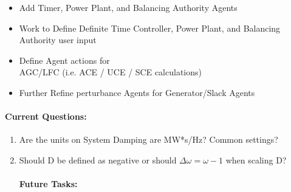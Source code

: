 \documentclass[12pt]{article}
\begin{document}
\begin{multicols}{2}
\begin{enumerate}
\begin{itemize}
		\item Add Timer, Power Plant, and Balancing Authority Agents
		\item Work to Define Definite Time Controller, Power Plant, and Balancing Authority user input
		
		\item Define Agent actions for \\ AGC/LFC (i.e. ACE / UCE / SCE calculations)
		\item Further Refine perturbance Agents for Generator/Slack Agents
		\end{itemize}
		

	\end{enumerate}
\vfill\null
\columnbreak
	\paragraph{Current Questions:}
	\begin{enumerate}

	\item Are the units on System Damping are MW*s/Hz? Common settings?
	\item Should D be defined as negative or should $\Delta\omega = \omega-1$ when scaling D?
	
		






\paragraph{Future Tasks:} %
	\begin{enumerate}


\end{enumerate}
\end{enumerate}
\end{multicols}
\end{document}
